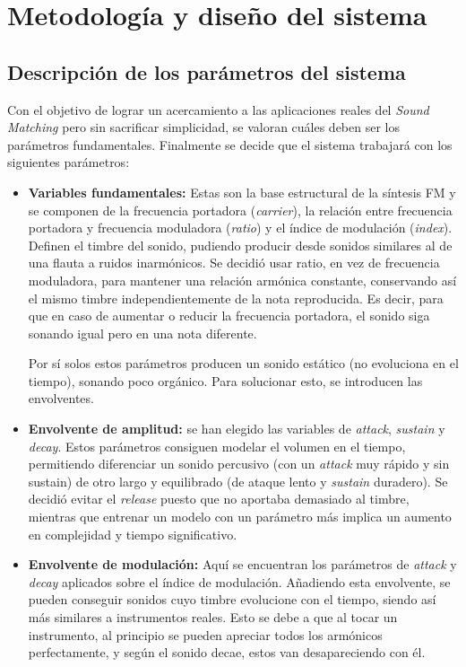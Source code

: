 \chapter{Metodología y diseño del sistema}
\label{cap:MetodologiaDisenoSistema}

\section{Descripción de los parámetros del sistema}

Con el objetivo de lograr un acercamiento a las aplicaciones reales del \textit{Sound Matching} pero sin sacrificar simplicidad, se valoran cuáles deben ser los parámetros fundamentales. Finalmente se decide que el sistema trabajará con los siguientes parámetros:

\begin{itemize}
    \item \textbf{Variables fundamentales: } Estas son la base estructural de la síntesis FM y se componen de la frecuencia portadora (\textit{carrier}), la relación entre frecuencia portadora y frecuencia moduladora (\textit{ratio}) y el índice de modulación (\textit{index}). Definen el timbre del sonido, pudiendo producir desde sonidos similares al de una flauta a ruidos inarmónicos. 
    Se decidió usar ratio, en vez de frecuencia moduladora, para mantener una relación armónica constante, conservando así el mismo timbre independientemente de la nota reproducida. Es decir, para que en caso de aumentar o reducir la frecuencia portadora, el sonido siga sonando igual pero en una nota diferente.
    
    Por sí solos estos parámetros producen un sonido estático (no evoluciona en el tiempo), sonando poco orgánico. Para solucionar esto, se introducen las envolventes.
    \item \textbf{Envolvente de amplitud: } se han elegido las variables de \textit{attack}, \textit{sustain} y \textit{decay}. Estos parámetros consiguen modelar el volumen en el tiempo, permitiendo diferenciar un sonido percusivo (con un \textit{attack} muy rápido y sin sustain) de otro largo y equilibrado (de ataque lento y \textit{sustain} duradero). Se decidió evitar el \textit{release} puesto que no aportaba demasiado al timbre, mientras que entrenar un modelo con un parámetro más implica un aumento en complejidad y tiempo significativo. 
    \item \textbf{Envolvente de modulación: } Aquí se encuentran los parámetros de \textit{attack} y \textit{decay} aplicados sobre el índice de modulación. Añadiendo esta envolvente, se pueden conseguir sonidos cuyo timbre evolucione con el tiempo, siendo así más similares a instrumentos reales. Esto se debe a que al tocar un instrumento, al principio se pueden apreciar todos los armónicos perfectamente, y según el sonido decae, estos van desapareciendo con él.     
\end{itemize}

